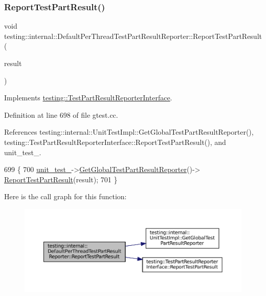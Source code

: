 \subsubsection{\texorpdfstring{Report\+Test\+Part\+Result()}{ReportTestPartResult()}}
{\footnotesize\ttfamily void testing\+::internal\+::\+Default\+Per\+Thread\+Test\+Part\+Result\+Reporter\+::\+Report\+Test\+Part\+Result (\begin{DoxyParamCaption}\item[{const \hyperlink{classtesting_1_1TestPartResult}{Test\+Part\+Result} \&}]{result }\end{DoxyParamCaption})\hspace{0.3cm}{\ttfamily [virtual]}}



Implements \hyperlink{classtesting_1_1TestPartResultReporterInterface_aa2f920e7a5a0a6d0faf19e3727928c22}{testing\+::\+Test\+Part\+Result\+Reporter\+Interface}.



Definition at line 698 of file gtest.\+cc.



References testing\+::internal\+::\+Unit\+Test\+Impl\+::\+Get\+Global\+Test\+Part\+Result\+Reporter(), testing\+::\+Test\+Part\+Result\+Reporter\+Interface\+::\+Report\+Test\+Part\+Result(), and unit\+\_\+test\+\_\+.


\begin{DoxyCode}
699                                   \{
700   \hyperlink{classtesting_1_1internal_1_1DefaultPerThreadTestPartResultReporter_a44f8ce831e79b6b25197ce8e4f2e08d6}{unit\_test\_}->\hyperlink{classtesting_1_1internal_1_1UnitTestImpl_a1cd291fd6751654924362164735d4b49}{GetGlobalTestPartResultReporter}()->
      \hyperlink{classtesting_1_1TestPartResultReporterInterface_aa2f920e7a5a0a6d0faf19e3727928c22}{ReportTestPartResult}(result);
701 \}
\end{DoxyCode}
Here is the call graph for this function\+:
\nopagebreak
\begin{figure}[H]
\begin{center}
\leavevmode
\includegraphics[width=350pt]{classtesting_1_1internal_1_1DefaultPerThreadTestPartResultReporter_ac6dc08eadc4e5a2a64a91d0b6c6b3aad_cgraph}
\end{center}
\end{figure}


